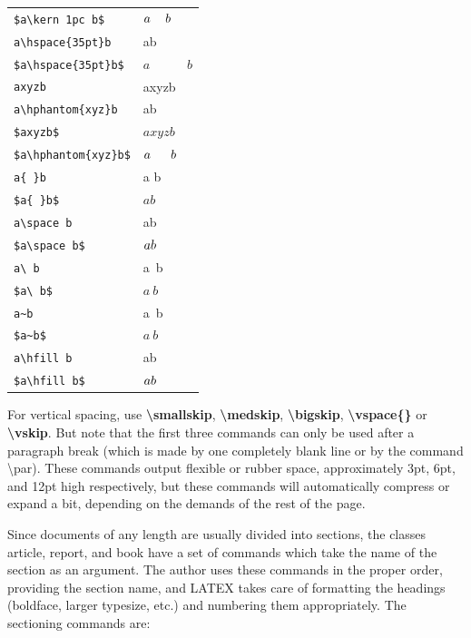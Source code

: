 \documentclass[12pt,openright]{book}
\begin{document}
\begin{center}
\begin{longtable}{p{}p{}}
  \verb|$a\kern 1pc b$|          & $a\kern 1pc b$ \\
  \verb|a\hspace{35pt}b|         & a\hspace{35pt}b \\
  \verb|$a\hspace{35pt}b$|       & $a\hspace{35pt}b$ \\
  \verb|axyzb|                   & axyzb \\
  \verb|a\hphantom{xyz}b|        & a\hphantom{xyz}b \\
  \verb|$axyzb$|                 & $axyzb$ \\
  \verb|$a\hphantom{xyz}b$|      & $a\hphantom{xyz}b$ \\
  \verb|a{ }b|                   & a{ }b \\
  \verb|$a{ }b$|                 & $a{ }b$ \\
  \verb|a\space b|               & a\space b \\
  \verb|$a\space b$|             & $a\space b$ \\
  \verb|a\ b|                    & a\ b \\
  \verb|$a\ b$|                  & $a\ b$ \\
  \verb|a~b|                     & a~b \\
  \verb|$a~b$|                   & $a~b$ \\
  \verb|a\hfill b|               & a\hfill b \\
  \verb|$a\hfill b$|             & $a\hfill b$ \\
\end{longtable}
\end{center}

For vertical spacing, use \textbf{\textbackslash smallskip}, \textbf{\textbackslash medskip}, \textbf{\textbackslash bigskip}, \textbf{\textbackslash vspace\{\}} or \textbf{\textbackslash vskip}. But note that the first three commands can only be used after a paragraph break (which is made by one completely blank line or by the command \textbackslash par). These commands output flexible or rubber space, approximately 3pt, 6pt, and 12pt high respectively, but these commands will automatically compress or expand a bit, depending on the demands of the rest of the page.

Since documents of any length are usually divided into sections, the classes article, report, and book have a set of commands which take the name of the section as an argument. The author uses these commands in the proper order, providing the section name, and LATEX takes care of formatting the headings (boldface, larger typesize, etc.) and numbering them appropriately. The sectioning commands are:
\end{document}
